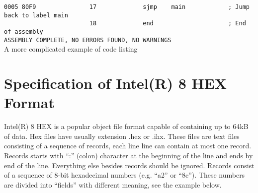 \begin{code}[h]
                        {\color{highlight_lst_address}\verb'0005'}{\color{highlight_lst_code}\verb' 80F9'}{\color{highlight_lst_line}\verb'               17'}\verb'             '{\color{highlight_instruction}\verb'sjmp'}\verb'    '{\color{highlight_constant}\verb'main'}\verb'            '{\color{highlight_comment}\verb'; Jump back to label main'}\\
                        {\color{highlight_lst_line}\verb'                        18'}\verb'             '{\color{highlight_directive}\verb'end'}\verb'                     '{\color{highlight_comment}\verb'; End of assembly'}\\
                        {\color{highlight_lst_msg}\verb'ASSEMBLY COMPLETE,'}\verb' NO ERRORS FOUND, NO WARNINGS'\\
                        \caption{A more complicated example of code listing}
                \end{code}

        \section{Specification of Intel(R) 8 HEX Format}
                Intel(R) 8 HEX is a popular object file format capable of containing up to
       64kB of data. Hex files have usually extension .hex or .ihx. These files are text files
       consisting of a sequence of records, each line line can contain at most one record.
       Records starts with ``:'' (colon) character at the beginning of the line and ends by
       end of the line. Everything else besides records should be ignored. Records consist
       of a sequence of 8-bit hexadecimal numbers (e.g. ``a2'' or ``8c''). These numbers are
       divided into ``fields'' with different meaning, see the example below.

